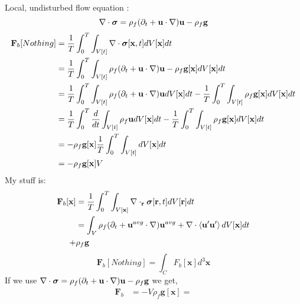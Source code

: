 Local, undisturbed flow equation :
\begin{equation}
    \mathbf{\nabla}\cdot\bm\sigma = \rho_f (\partial_t + \textbf{u}\cdot \mathbf{\nabla})\textbf{u} - \rho_f \textbf{g}
\end{equation}
\begin{align}
    \textbf{F}_b[Nothing] &= 
    \frac{1}{T}\int_{0}^{T}
     \int_{V[t]}\mathbf{\nabla}\cdot \bm\sigma[\textbf{x},t] dV[\textbf{x}] dt\\
     &=
     \frac{1}{T}\int_{0}^{T}
      \int_{V[t]}\rho_f (\partial_t + \textbf{u}\cdot \mathbf{\nabla})\textbf{u} - \rho_f \textbf{g}[\textbf{x}] dV[\textbf{x}] dt\\
     &=
     \frac{1}{T}\int_{0}^{T}
     \int_{V[t]}\rho_f (\partial_t + \textbf{u}\cdot \mathbf{\nabla})\textbf{u} dV[\textbf{x}] dt
     -\frac{1}{T}\int_{0}^{T}
      \int_{V[t]}\rho_f \textbf{g}[\textbf{x}] dV[\textbf{x}] dt\\
     &=
     \frac{1}{T}\int_{0}^{T}
     \frac{d}{dt}\int_{V[t]}\rho_f \textbf{u} dV[\textbf{x}] dt
     -\frac{1}{T}\int_{0}^{T}
      \int_{V[t]}\rho_f \textbf{g}[\textbf{x}] dV[\textbf{x}] dt\\
     &=
     -
      \rho_f \textbf{g}[\textbf{x}] 
      \frac{1}{T}\int_{0}^{T}
      \int_{V[t]} dV[\textbf{x}] dt\\
     &=
     -
      \rho_f \textbf{g}[\textbf{x}] 
      V
      \\
\end{align}
My stuff is: 
\begin{align}
    \textbf{F}_b[\textbf{x}] &= 
    \frac{1}{T}\int_{0}^{T}
     \int_{V[\textbf{x}]}\mathbf{\nabla}\cdot_\textbf{r} \bm\sigma[\textbf{r},t]  dV[\textbf{r}] dt\\
     &=
     \int_{V}\rho_f (\partial_t + \textbf{u}^{avg}\cdot \mathbf{\nabla})\textbf{u}^{avg}+ \mathbf{\nabla}\cdot \left<\textbf{u}'\textbf{u}'\right> dV[\textbf{x}] dt\\
     + &\rho_f \textbf{g}\\
\end{align}
\begin{equation}
    \textbf{F}_b[Nothing]  = \int_C F_b[\textbf{x}] d^3 \textbf{x}
\end{equation}
If we use $\mathbf{\nabla}\cdot\bm\sigma = \rho_f (\partial_t + \textbf{u}\cdot \mathbf{\nabla})\textbf{u} - \rho_f \textbf{g}$ we get, 
\begin{align}
    \textbf{F}_b &= 
     -
       V \rho_f \textbf{g}[\textbf{x}]  
      =
\end{align}